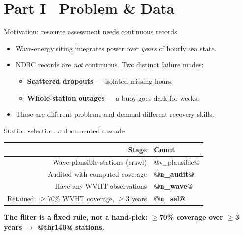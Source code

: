 \documentclass[aspectratio=169]{beamer}
\newcommand{\take}[1]{\vspace{0.6ex}\begin{center}\textbf{\color{colgraph}#1}\end{center}}
\begin{document}
\section{Part I \textperiodcentered\ Problem \& Data}

\begin{frame}{Motivation: resource assessment needs continuous records}
  \begin{itemize}
    \item Wave-energy siting integrates power over \emph{years} of hourly sea state.
    \item NDBC records are \emph{not} continuous. Two distinct failure modes:
    \begin{itemize}
      \item[--] \textbf{Scattered dropouts} --- isolated missing hours.
      \item[--] \textbf{Whole-station outages} --- a buoy goes dark for weeks.
    \end{itemize}
    \item These are different problems and demand different recovery skills.
  \end{itemize}
\end{frame}

\begin{frame}{Station selection: a documented cascade}
  \begin{center}
  \begin{tabular}{r l}
    \toprule
    Stage & Count \\
    \midrule
    Wave-plausible stations (crawl) & @v_plausible@ \\
    Audited with computed coverage & \textbf{@n_audit@} \\
    Have any WVHT observations & \textbf{@n_wave@} \\
    Retained: $\ge$70\% WVHT coverage, $\ge$3 years & \textbf{@n_sel@} \\
    \bottomrule
  \end{tabular}
  \end{center}
  \take{The filter is a fixed rule, not a hand-pick: $\ge$70\% coverage over $\ge$3 years $\rightarrow$ @thr140@ stations.}
\end{frame}
\end{document}
